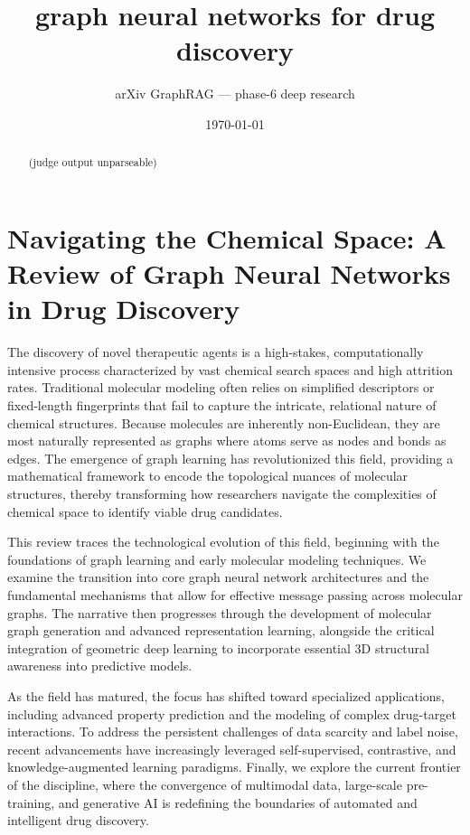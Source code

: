 \documentclass[11pt]{article}
\title{graph neural networks for drug discovery}
\author{arXiv GraphRAG --- phase-6 deep research}
\date{\today}
\begin{document}
\maketitle

\begin{abstract}
(judge output unparseable)
\end{abstract}

\section{Navigating the Chemical Space: A Review of Graph Neural Networks in Drug Discovery}

The discovery of novel therapeutic agents is a high-stakes, computationally intensive process characterized by vast chemical search spaces and high attrition rates. Traditional molecular modeling often relies on simplified descriptors or fixed-length fingerprints that fail to capture the intricate, relational nature of chemical structures. Because molecules are inherently non-Euclidean, they are most naturally represented as graphs where atoms serve as nodes and bonds as edges. The emergence of graph learning has revolutionized this field, providing a mathematical framework to encode the topological nuances of molecular structures, thereby transforming how researchers navigate the complexities of chemical space to identify viable drug candidates.

This review traces the technological evolution of this field, beginning with the foundations of graph learning and early molecular modeling techniques. We examine the transition into core graph neural network architectures and the fundamental mechanisms that allow for effective message passing across molecular graphs. The narrative then progresses through the development of molecular graph generation and advanced representation learning, alongside the critical integration of geometric deep learning to incorporate essential 3D structural awareness into predictive models.

As the field has matured, the focus has shifted toward specialized applications, including advanced property prediction and the modeling of complex drug-target interactions. To address the persistent challenges of data scarcity and label noise, recent advancements have increasingly leveraged self-supervised, contrastive, and knowledge-augmented learning paradigms. Finally, we explore the current frontier of the discipline, where the convergence of multimodal data, large-scale pre-training, and generative AI is redefining the boundaries of automated and intelligent drug discovery.
\end{document}
